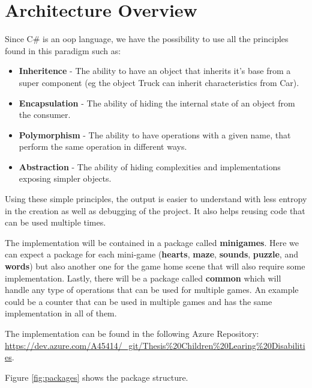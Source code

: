 \newpage

\section{Architecture Overview}
\label{arqOverview}
Since C\# is an \gls{oop} language, we have the possibility to use all the principles found in this paradigm such as:

\begin{itemize}
    \item \textbf{Inheritence} - The ability to have an object that inherits it's base from a super component (eg the object Truck can inherit characteristics from Car).
    \item \textbf{Encapsulation} - The ability of hiding the internal state of an object from the consumer.
    \item \textbf{Polymorphism} - The ability to have operations with a given name, that perform the same operation in different ways.
    \item \textbf{Abstraction} - The ability of hiding complexities and implementations exposing simpler objects.
\end{itemize}

Using these simple principles, the output is easier to understand with less entropy in the creation as well as debugging of the project. It also helps reusing code that can be used multiple times.

The implementation will be contained in a package called \textbf{minigames}. Here we can expect a package for each mini-game (\textbf{hearts}, \textbf{maze}, \textbf{sounds}, \textbf{puzzle}, and \textbf{words}) but also another one for the game home scene that will also require some implementation. Lastly, there will be a package called \textbf{common} which will handle any type of operations that can be used for multiple games. An example could be a counter that can be used in multiple games and has the same implementation in all of them.

The implementation can be found in the following Azure Repository: \url{https://dev.azure.com/A45414/_git/Thesis%20Children%20Learing%20Disabilities}.

\newpage
Figure \ref{fig:packages} shows the package structure.

